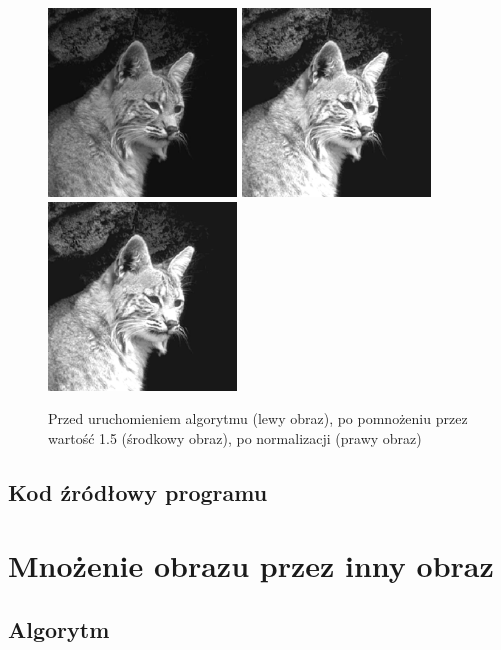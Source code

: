 \documentclass[a4paper,12pt]{book}
\begin{document}
\begin{figure}[H]
	\caption{Przed uruchomieniem algorytmu (lewy obraz), po pomnożeniu przez wartość 1.5 (środkowy obraz), po normalizacji (prawy obraz)}
	\includegraphics[width=5cm, height=5cm]{cat-unmodified.jpg}
	\includegraphics[width=5cm, height=5cm]{2/multiply-gray-const-4.png}
	\includegraphics[width=5cm, height=5cm]{2/multiply-gray-const-4-norm.png}
\end{figure}

\subsection*{Kod źródłowy programu}

\section{Mnożenie obrazu przez inny obraz}
\subsection*{Algorytm}
\end{document}
